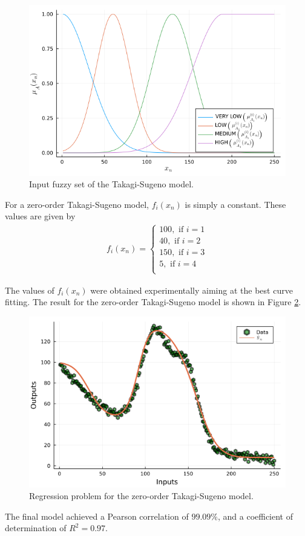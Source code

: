 \documentclass[english]{sobraep}
\begin{document}
\begin{figure}[H]
    \centering
    \includegraphics[scale=.35]{../figs/takagi_sugeno/fuzzyset_takagi_sugeno.png}
    \caption{Input fuzzy set of the Takagi-Sugeno model.}
    \label{fig:input-fuzzy-set-takagi-sugeno}
\end{figure}

For a zero-order Takagi-Sugeno model, \(f_i(x_n)\) is simply a constant. These values are given by
\begin{align}
    f_i(x_n) = \left\{\begin{array}{c}
         100, \text{ if } i=1 \\
         40, \text{ if } i=2 \\
         150, \text{ if } i=3 \\
         5, \text{ if } i=4 \\
    \end{array} \right.
\end{align}

The values of \(f_i(x_n)\) were obtained experimentally aiming at the best curve fitting. The result for the zero-order Takagi-Sugeno model is shown in Figure \ref{fig:takagi-sugeno-regression}.
\begin{figure}[H]
    \centering
    \includegraphics[scale=.35]{../figs/takagi_sugeno/fuzzy_prediction.png}
    \caption{Regression problem for the zero-order Takagi-Sugeno model.}
    \label{fig:takagi-sugeno-regression}
\end{figure}

The final model achieved a Pearson correlation of \(99.09\%\), and a coefficient of determination of \(R^2 = 0.97\).




\balance
\end{document}
